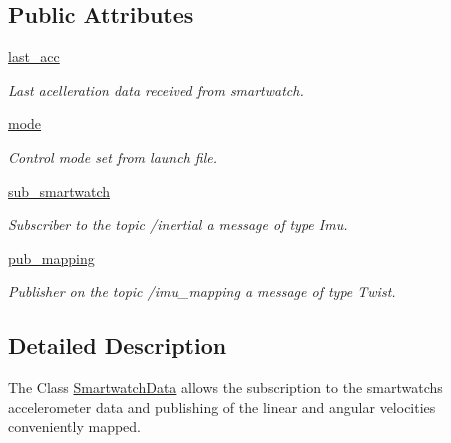 \subsection*{Public Attributes}
\begin{DoxyCompactItemize}
\item 
\mbox{\label{classimu__data__map_1_1SmartwatchData_a03c21e5bb85eab7f5403536454bc7956}} 
\mbox{\hyperlink{classimu__data__map_1_1SmartwatchData_a03c21e5bb85eab7f5403536454bc7956}{last\+\_\+acc}}
\begin{DoxyCompactList}\small\item\em Last acelleration data received from smartwatch. \end{DoxyCompactList}\item 
\mbox{\label{classimu__data__map_1_1SmartwatchData_a8f263648884dd35b64488bad05f6fa5a}} 
\mbox{\hyperlink{classimu__data__map_1_1SmartwatchData_a8f263648884dd35b64488bad05f6fa5a}{mode}}
\begin{DoxyCompactList}\small\item\em Control mode set from launch file. \end{DoxyCompactList}\item 
\mbox{\label{classimu__data__map_1_1SmartwatchData_a9aa7d44c665b51c5fd06471c2efd1bbd}} 
\mbox{\hyperlink{classimu__data__map_1_1SmartwatchData_a9aa7d44c665b51c5fd06471c2efd1bbd}{sub\+\_\+smartwatch}}
\begin{DoxyCompactList}\small\item\em Subscriber to the topic /inertial a message of type Imu. \end{DoxyCompactList}\item 
\mbox{\label{classimu__data__map_1_1SmartwatchData_ac0b0ac43a0f916afc0fdd2af2d8d38cf}} 
\mbox{\hyperlink{classimu__data__map_1_1SmartwatchData_ac0b0ac43a0f916afc0fdd2af2d8d38cf}{pub\+\_\+mapping}}
\begin{DoxyCompactList}\small\item\em Publisher on the topic /imu\+\_\+mapping a message of type Twist. \end{DoxyCompactList}\end{DoxyCompactItemize}


\subsection{Detailed Description}
The Class \mbox{\hyperlink{classimu__data__map_1_1SmartwatchData}{Smartwatch\+Data}} allows the subscription to the smartwatch\textquotesingle{}s accelerometer data and publishing of the linear and angular velocities conveniently mapped. 



